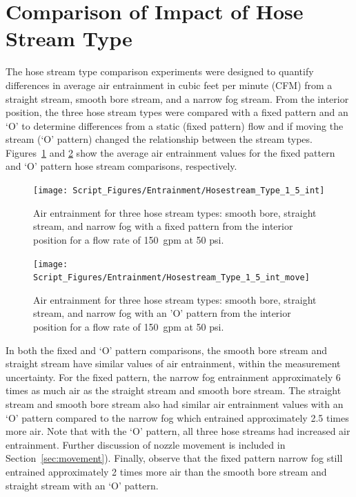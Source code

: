 \documentclass[12pt,oneside]{book}
\begin{document}
\section{Comparison of Impact of Hose Stream Type}

The hose stream type comparison experiments were designed to quantify differences in average air entrainment in cubic feet per minute (CFM) from a straight stream, smooth bore stream, and a narrow fog stream. From the interior position, the three hose stream types were compared with a fixed pattern and an `O' to determine differences from a static (fixed pattern) flow and if moving the stream (`O' pattern) changed the relationship between the stream types. Figures~\ref{fig:hosestream_type} and \ref{fig:hosestream_type_o} show the average air entrainment values for the fixed pattern and `O' pattern hose stream comparisons, respectively.

\begin{figure}[!ht]
	\centering
	\texttt{[image: Script\_Figures/Entrainment/Hosestream\_Type\_1\_5\_int]}
	\caption[Air Entrainment Comparison of Hose Stream Type Fixed Pattern]{Air entrainment for three hose stream types: smooth bore, straight stream, and narrow fog with a fixed pattern from the interior position for a flow rate of 150~gpm at 50 psi.}
	\label{fig:hosestream_type}
\end{figure}

\begin{figure}[!ht]
	\centering
	\texttt{[image: Script\_Figures/Entrainment/Hosestream\_Type\_1\_5\_int\_move]}
	\caption[Air Entrainment Comparison of Hose Stream Type 'O' Pattern]{Air entrainment for three hose stream types: smooth bore, straight stream, and narrow fog with an 'O' pattern from the interior position for a flow rate of 150~gpm at 50 psi.}
	\label{fig:hosestream_type_o}
\end{figure}


In both the fixed and `O' pattern comparisons, the smooth bore stream and straight stream have similar values of air entrainment, within the measurement uncertainty. For the fixed pattern, the narrow fog entrainment approximately 6 times as much air as the straight stream and smooth bore stream. The straight stream and smooth bore stream also had similar air entrainment values with an `O' pattern compared to the narrow fog which entrained approximately 2.5 times more air. Note that with the `O' pattern, all three hose streams had increased air entrainment. Further discussion of nozzle movement is included in Section~\ref{sec:movement}). Finally, observe that the fixed pattern narrow fog still entrained approximately 2 times more air than the smooth bore stream and straight stream with an `O' pattern.
\end{document}
